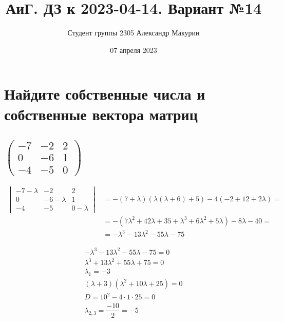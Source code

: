 \documentclass[12pt]{article}
\title{АиГ. ДЗ к 2023-04-14. Вариант №14}
\author{Студент группы 2305 Александр Макурин}
\date{07 апреля 2023}
\begin{document}
\maketitle

\begin{sloppypar}
    \section{Найдите собственные числа и собственные вектора матриц}
    \subsection{$\begin{pmatrix}
                -7 & -2 & 2 \\
                0  & -6 & 1 \\
                -4 & -5 & 0
            \end{pmatrix}$}

    \begin{align*}
        \begin{vmatrix}
            -7 - \lambda & -2           & 2           \\
            0            & -6 - \lambda & 1           \\
            -4           & -5           & 0 - \lambda
        \end{vmatrix}
         & = -(7 + \lambda)(\lambda(\lambda + 6) + 5) -4(-2 + 12 + 2\lambda) =                   \\
         & =-(7\lambda^2 + 42\lambda + 35 + \lambda^3 + 6\lambda^2 + 5\lambda) - 8\lambda - 40 = \\
         & = -\lambda^3 - 13\lambda^2 - 55\lambda - 75
    \end{align*}

    \begin{align*}
        -\lambda^3 - 13\lambda^2 - 55\lambda - 75 = 0 \\
        \lambda^3 + 13\lambda^2 + 55\lambda + 75 = 0  \\
        \lambda_1 = -3                                \\
        (\lambda + 3)(\lambda^2 + 10\lambda + 25) = 0 \\
        D = 10^2 - 4 \cdot 1 \cdot 25 = 0             \\
        \lambda_{2,3} = \dfrac{-10}{2} = -5           \\
    \end{align*}


\end{sloppypar}
\end{document}
